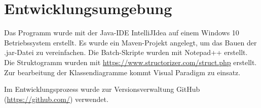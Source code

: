 \chapter{Entwicklungsumgebung}\label{ch:entwicklungsumgebung}

Das Programm wurde mit der Java-IDE \glqq IntelliJIdea\grqq{} auf einem Windows 10 Betriebssystem erstellt.
Es wurde ein Maven-Projekt angelegt, um das Bauen der .jar-Datei zu vereinfachen.
Die Batch-Skripte wurden mit Notepad++ erstellt.
Die Struktogramm wurden mit \url{https://www.structorizer.com/struct.php} erstellt.
Zur bearbeitung der Klassendiagramme kommt Visual Paradigm zu einsatz.

Im Entwicklungsprozess wurde zur Versionsverwaltung GitHub (\url{https://github.com/}) verwendet.